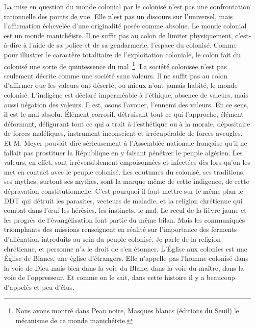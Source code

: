 \documentclass[french,twoside]{book} %
\begin{document}
\noindent La mise en question du monde colonial par le colonisé n’est pas une confrontation rationnelle des points de vue. Elle n’est pas un discours sur l’universel, mais l’affirmation échevelée d’une originalité posée comme absolue. Le monde colonial est un monde manichéiste. Il ne suffit pas au colon de limiter physiquement, c’est-à-dire à l’aide de sa police et de sa gendarmerie, l’espace du colonisé. Comme pour illustrer le caractère totalitaire de l’exploitation coloniale, le colon fait du colonisé une sorte de quintessence du mal \footnote{Nous avons montré dans Peau noire, Masques blancs (éditions du Seuil) le mécanisme de ce monde manichéiste.}. La société colonisée n’est pas seulement décrite comme une société sans valeurs. Il ne suffit pas au colon d’affirmer que les valeurs ont déserté, ou mieux n’ont jamais habité, le monde colonisé. L’indigène est déclaré imperméable à l’éthique, absence de valeurs, mais aussi négation des valeurs. Il est, osons l’avouer, l’ennemi des valeurs. En ce sens, il est le mal absolu. Élément corrosif, détruisant tout ce qui l’approche, élément déformant, défigurant tout ce qui a trait à l’esthétique ou à la morale, dépositaire de forces maléfiques, instrument inconscient et irrécupérable de forces aveugles. Et   M. Meyer pouvait dire sérieusement à l’Assemblée nationale française qu’il ne fallait pas prostituer la République en y faisant pénétrer le peuple algérien. Les valeurs, en effet, sont irréversiblement empoisonnées et infectées dès lors qu’on les met en contact avec le peuple colonisé. Les coutumes du colonisé, ses traditions, ses mythes, surtout ses mythes, sont la marque même de cette indigence, de cette dépravation constitutionnelle. C’est pourquoi il faut mettre sur le même plan le DDT qui détruit les parasites, vecteurs de maladie, et la religion chrétienne qui combat dans l’œuf les hérésies, les instincts, le mal. Le recul de la fièvre jaune et les progrès de l’évangélisation font partie du même bilan. Mais les communiqués triomphants des missions renseignent en réalité sur l’importance des ferments d’aliénation introduits au sein du peuple colonisé. Je parle de la religion chrétienne, et personne n’a le droit de s’en étonner. L’Église aux colonies est une Église de Blancs, une église d’étrangers. Elle n’appelle pas l’homme colonisé dans la voie de Dieu mais bien dans la voie du Blanc, dans la voie du maître, dans la voie de l’oppresseur. Et comme on le sait, dans cette histoire il y a beaucoup d’appelés et peu d’élus.\par
\end{document}
